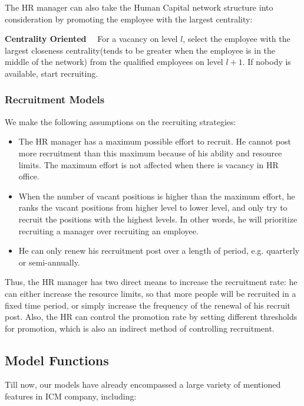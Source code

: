 \documentclass[tcn = 37075, sheet = false, abstract = false]{mcmthesis}
\begin{document}
The HR manager can also take the Human Capital network structure into consideration by promoting the employee with the largest centrality: 


\noindent \textbf{Centrality Oriented} \ \ For a vacancy on level $l$, select the employee with the largest closeness centrality(tends to be greater when the employee is in the middle of the network) from the qualified employees on level $l+1$. If nobody is available, start recruiting.


\subsubsection{Recruitment Models}
We make the following assumptions on the recruiting strategies:
\begin{itemize}
\item The HR manager has a maximum possible effort to recruit. He cannot post more recruitment than this maximum because of his ability and resource limits. The maximum effort is not affected when there is vacancy in HR office. 
\item When the number of vacant positions is higher than the maximum effort, he ranks the vacant positions from higher level to lower level, and only try to recruit the positions with the highest levels. In other words, he will prioritize recruiting a manager over recruiting an employee. 
\item He can only renew his recruitment post over a length of period, e.g. quarterly or semi-annually.
\end{itemize}

Thus, the HR manager has two direct means to increase the recruitment rate: he can either increase the resource limits, so that more people will be recruited in a fixed time period, or simply increase the frequency of the renewal of his recruit post. Also, the HR can control the promotion rate by setting different thresholds for promotion, which is also an indirect method of controlling recruitment. 

\subsection{Model Functions}

Till now, our models have already encompassed a large variety of mentioned features in ICM company, including:
\end{document}
